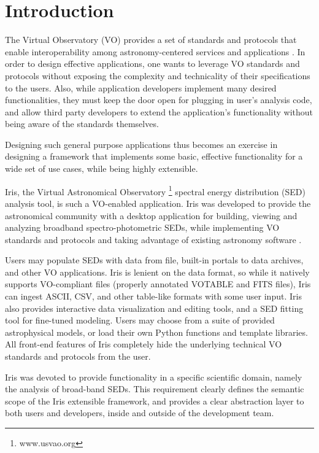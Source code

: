 \label{sec:introduction}
\section{Introduction} 
The Virtual Observatory (VO) provides a set of standards and protocols that enable interoperability among astronomy-centered services and applications \cite{}.
In order to design effective applications, one wants to leverage VO standards and protocols without exposing the complexity and technicality of their specifications to the users. Also, while application developers implement many desired functionalities, they must keep the door open for plugging in user's analysis code, and allow third party developers to extend the application's functionality without being aware of the standards themselves.

Designing such general purpose applications thus becomes an exercise in designing a framework that implements some basic, effective functionality for a wide set of use cases, while being highly extensible.

Iris, the Virtual Astronomical Observatory \footnote{www.usvao.org} spectral energy distribution (SED) analysis tool, is such a VO-enabled application. Iris was developed to provide the astronomical community with a desktop application for building, viewing and analyzing broadband spectro-photometric SEDs, while implementing VO standards and protocols and taking advantage of existing astronomy software \cite{2012ASPC..461..893D}.

Users may populate SEDs with data from file, built-in portals to data archives, and other VO applications. Iris is lenient on the data format, so while it natively supports VO-compliant files (properly annotated VOTABLE and FITS files), Iris can ingest ASCII, CSV, and other table-like formats with some user input. Iris also provides interactive data visualization and editing tools, and a SED fitting tool for fine-tuned modeling. Users may choose from a suite of provided astrophysical models, or load their own Python functions and template libraries. All front-end features of Iris completely hide the underlying technical VO standards and protocols from the user.

Iris was devoted to provide functionality in a specific scientific domain, namely the analysis of broad-band SEDs. This requirement clearly defines the semantic scope of the  Iris extensible framework, and provides a clear abstraction layer to both users and developers, inside and outside of the development team.

